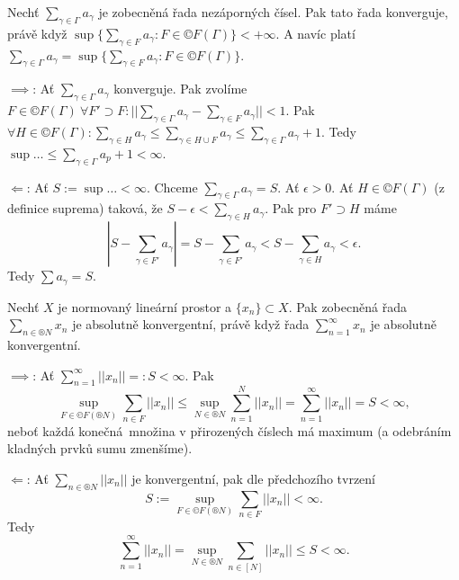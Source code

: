 \documentclass[12pt]{article}					%
\begin{document}
\begin{tvrzeni}
	Nechť $\sum_{\gamma \in \Gamma} a_\gamma$ je zobecněná řada nezáporných čísel. Pak tato řada konverguje, právě když $\sup\{\sum_{\gamma \in F} a_\gamma: F \in ©F(\Gamma)\} < +∞$. A navíc platí $\sum_{\gamma \in \Gamma} a_\gamma = \sup\{\sum_{\gamma \in F} a_\gamma: F \in ©F(\Gamma)\}$.

	\begin{dukazin}
		$\implies$: Ať $\sum_{\gamma \in \Gamma} a_\gamma$ konverguje. Pak zvolíme $F \in ©F(\Gamma)\ \forall F' \supset F: ||\sum_{\gamma \in \Gamma} a_\gamma - \sum_{\gamma \in F} a_\gamma|| < 1$.
		Pak $\forall H \in ©F(\Gamma): \sum_{\gamma \in H} a_\gamma ≤ \sum_{\gamma \in H \cup F} a_\gamma ≤ \sum_{\gamma \in \Gamma}a_\gamma + 1.$ Tedy $\sup… ≤ \sum_{\gamma \in \Gamma} a_p + 1 < ∞$.

		$\Leftarrow$: Ať $S:= \sup… < ∞$. Chceme $\sum_{\gamma \in \Gamma} a_\gamma = S$. Ať $\epsilon > 0$. Ať $H \in ©F(\Gamma)$ (z definice suprema) taková, že $S - \epsilon < \sum_{\gamma \in H} a_\gamma$. Pak pro $F' \supset H$ máme
		$$ |S - \sum_{\gamma \in F'} a_\gamma| = S - \sum_{\gamma \in F'} a_\gamma < S - \sum_{\gamma \in H}a_\gamma < \epsilon. $$
		Tedy $\sum a_\gamma = S$.
	\end{dukazin}
\end{tvrzeni}


\begin{tvrzeni}
	Nechť $X$ je normovaný lineární prostor a $\{x_n\} \subset X$. Pak zobecněná řada $\sum_{n \in ®N}x_n$ je absolutně konvergentní, právě když řada $\sum_{n=1}^∞ x_n$ je absolutně konvergentní.

	\begin{dukazin}
		$\implies$: Ať $\sum_{n=1}^∞ ||x_n|| =: S < ∞$. Pak
		$$ \sup_{F \in ©F(®N)} \sum_{n \in F} ||x_n|| ≤ \sup_{N \in ®N} \sum_{n=1}^N ||x_n|| = \sum_{n=1}^∞ ||x_n|| = S < ∞, $$
		neboť každá konečná množina v přirozených číslech má maximum (a odebráním kladných prvků sumu zmenšíme).

		$\Leftarrow$: Ať $\sum_{n \in ®N} ||x_n||$ je konvergentní, pak dle předchozího tvrzení
		$$ S:=\sup_{F \in ©F(®N)} \sum_{n \in F} ||x_n|| < ∞. $$
		Tedy
		$$ \sum_{n=1}^∞||x_n|| = \sup_{N \in ®N} \sum_{n \in [N]} ||x_n|| ≤ S < ∞. $$
	\end{dukazin}
\end{tvrzeni}
\end{document}
